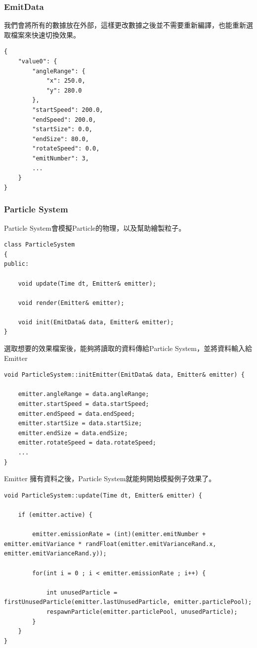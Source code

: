\subsubsection{EmitData}
我們會將所有的數據放在外部，這樣更改數據之後並不需要重新編譯，也能重新選取檔案來快速切換效果。
\begin{lstlisting}
{
    "value0": {
        "angleRange": {
            "x": 250.0,
            "y": 280.0
        },
        "startSpeed": 200.0,
        "endSpeed": 200.0,
        "startSize": 0.0,
        "endSize": 80.0,
        "rotateSpeed": 0.0,
        "emitNumber": 3,
        ...
    }
}
\end{lstlisting}

\subsubsection{Particle System}

Particle System會模擬Particle的物理，以及幫助繪製粒子。
\begin{lstlisting}
class ParticleSystem
{
public:

    void update(Time dt, Emitter& emitter);
    
    void render(Emitter& emitter);

    void init(EmitData& data, Emitter& emitter);
}
\end{lstlisting}

選取想要的效果檔案後，能夠將讀取的資料傳給Particle System，並將資料輸入給Emitter

\begin{lstlisting}
void ParticleSystem::initEmitter(EmitData& data, Emitter& emitter) {

    emitter.angleRange = data.angleRange;
    emitter.startSpeed = data.startSpeed;
    emitter.endSpeed = data.endSpeed;
    emitter.startSize = data.startSize;
    emitter.endSize = data.endSize;
    emitter.rotateSpeed = data.rotateSpeed;
    ...
}
\end{lstlisting}

Emitter 擁有資料之後，Particle System就能夠開始模擬例子效果了。

\begin{lstlisting}
void ParticleSystem::update(Time dt, Emitter& emitter) {

    if (emitter.active) {

        emitter.emissionRate = (int)(emitter.emitNumber + emitter.emitVariance * randFloat(emitter.emitVarianceRand.x, emitter.emitVarianceRand.y));

        for(int i = 0 ; i < emitter.emissionRate ; i++) {

            int unusedParticle = firstUnusedParticle(emitter.lastUnusedParticle, emitter.particlePool);
            respawnParticle(emitter.particlePool, unusedParticle);
        }
    }
}
\end{lstlisting}

